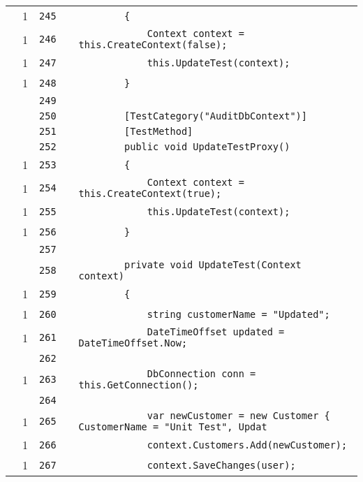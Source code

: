 \documentclass[a4paper,10pt]{article}
\begin{document}
\begin{longtable}[l]{lrrll}
\cellcolor{green} & 1 & \verb~245~ & & \verb~        {~\\
\cellcolor{green} & 1 & \verb~246~ & & \verb~            Context context = this.CreateContext(false);~\\
\cellcolor{green} & 1 & \verb~247~ & & \verb~            this.UpdateTest(context);~\\
\cellcolor{green} & 1 & \verb~248~ & & \verb~        }~\\
\cellcolor{gray} &  & \verb~249~ & & \verb~~\\
\cellcolor{gray} &  & \verb~250~ & & \verb~        [TestCategory("AuditDbContext")]~\\
\cellcolor{gray} &  & \verb~251~ & & \verb~        [TestMethod]~\\
\cellcolor{gray} &  & \verb~252~ & & \verb~        public void UpdateTestProxy()~\\
\cellcolor{green} & 1 & \verb~253~ & & \verb~        {~\\
\cellcolor{green} & 1 & \verb~254~ & & \verb~            Context context = this.CreateContext(true);~\\
\cellcolor{green} & 1 & \verb~255~ & & \verb~            this.UpdateTest(context);~\\
\cellcolor{green} & 1 & \verb~256~ & & \verb~        }~\\
\cellcolor{gray} &  & \verb~257~ & & \verb~~\\
\cellcolor{gray} &  & \verb~258~ & & \verb~        private void UpdateTest(Context context)~\\
\cellcolor{green} & 1 & \verb~259~ & & \verb~        {~\\
\cellcolor{green} & 1 & \verb~260~ & & \verb~            string customerName = "Updated";~\\
\cellcolor{green} & 1 & \verb~261~ & & \verb~            DateTimeOffset updated = DateTimeOffset.Now;~\\
\cellcolor{gray} &  & \verb~262~ & & \verb~~\\
\cellcolor{green} & 1 & \verb~263~ & & \verb~            DbConnection conn = this.GetConnection();~\\
\cellcolor{gray} &  & \verb~264~ & & \verb~~\\
\cellcolor{green} & 1 & \verb~265~ & & \verb~            var newCustomer = new Customer { CustomerName = "Unit Test", Updat~\\
\cellcolor{green} & 1 & \verb~266~ & & \verb~            context.Customers.Add(newCustomer);~\\
\cellcolor{green} & 1 & \verb~267~ & & \verb~            context.SaveChanges(user);~\\

\end{longtable}
\end{document}
